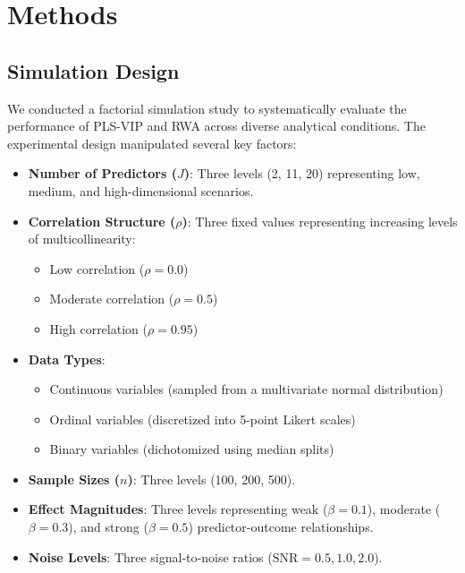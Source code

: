 \section{Methods}

\subsection{Simulation Design}
We conducted a factorial simulation study to systematically evaluate the performance of PLS-VIP and RWA across diverse analytical conditions. The experimental design manipulated several key factors:

\begin{itemize}
\item \textbf{Number of Predictors ($J$)}: Three levels (2, 11, 20) representing low, medium, and high-dimensional scenarios.
\item \textbf{Correlation Structure ($\rho$)}: Three fixed values representing increasing levels of multicollinearity:
\begin{itemize}
\item Low correlation ($\rho = 0.0$)
\item Moderate correlation ($\rho = 0.5$)
\item High correlation ($\rho = 0.95$)
\end{itemize}
\item \textbf{Data Types}:
\begin{itemize}
\item Continuous variables (sampled from a multivariate normal distribution)
\item Ordinal variables (discretized into 5-point Likert scales)
\item Binary variables (dichotomized using median splits)
\end{itemize}
\item \textbf{Sample Sizes ($n$)}: Three levels (100, 200, 500).
\item \textbf{Effect Magnitudes}: Three levels representing weak ($\beta = 0.1$), moderate ($\beta = 0.3$), and strong ($\beta = 0.5$) predictor-outcome relationships.
\item \textbf{Noise Levels}: Three signal-to-noise ratios ($\text{SNR} = 0.5, 1.0, 2.0$).
\end{itemize}

